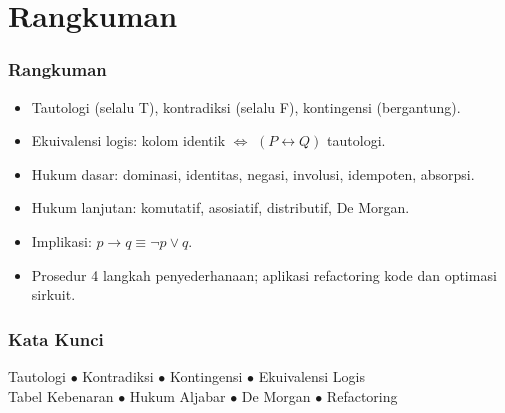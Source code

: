 \documentclass[handout]{beamer}
\theoremstyle{definition}
\theoremstyle{example}
\begin{document}
\section{Rangkuman}

\begin{frame}
\frametitle{Rangkuman}
\begin{itemize}
  \item Tautologi (selalu T), kontradiksi (selalu F), kontingensi (bergantung).
  \item Ekuivalensi logis: kolom identik $\Leftrightarrow$ $(P \leftrightarrow Q)$ tautologi.
  \item Hukum dasar: dominasi, identitas, negasi, involusi, idempoten, absorpsi.
  \item Hukum lanjutan: komutatif, asosiatif, distributif, De Morgan.
  \item Implikasi: $p \rightarrow q \equiv \neg p \vee q$.
  \item Prosedur 4 langkah penyederhanaan; aplikasi refactoring kode dan optimasi sirkuit.
\end{itemize}
\end{frame}

\begin{frame}
\frametitle{Kata Kunci}
\begin{center}
Tautologi $\bullet$ Kontradiksi $\bullet$ Kontingensi $\bullet$ Ekuivalensi Logis\\
Tabel Kebenaran $\bullet$ Hukum Aljabar $\bullet$ De Morgan $\bullet$ Refactoring
\end{center}
\end{frame}
\end{document}

